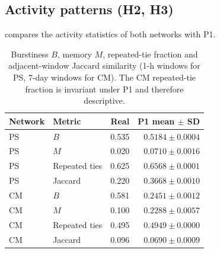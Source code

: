 \subsection{Activity patterns (H2, H3)}\label{sec:r-activity}
 compares the activity statistics of both networks with P1.

\begin{table}[t]
\centering\small
\begin{tabular*}{\columnwidth}{@{\extracolsep{\fill}}llrr@{}}
\toprule Network & Metric & Real & P1 mean $\pm$ SD \\
\midrule
PS & $B$ & 0.535 & $0.5184\pm0.0004$ \\
PS & $M$ & 0.020 & $0.0710\pm0.0016$ \\
PS & Repeated ties & 0.625 & $0.6568\pm0.0001$ \\
PS & Jaccard & 0.220 & $0.3668\pm0.0010$ \\
CM & $B$ & 0.581 & $0.2451\pm0.0012$ \\
CM & $M$ & 0.100 & $0.2288\pm0.0057$ \\
CM & Repeated ties & 0.495 & $0.4949\pm0.0000$ \\
CM & Jaccard & 0.096 & $0.0690\pm0.0009$ \\
\bottomrule\end{tabular*}
\caption{Burstiness $B$, memory $M$, repeated-tie fraction and adjacent-window Jaccard
similarity (1-h windows for PS, 7-day windows for CM). The CM repeated-tie fraction is
invariant under P1 and therefore descriptive.}\label{tab:burst}
\end{table}

